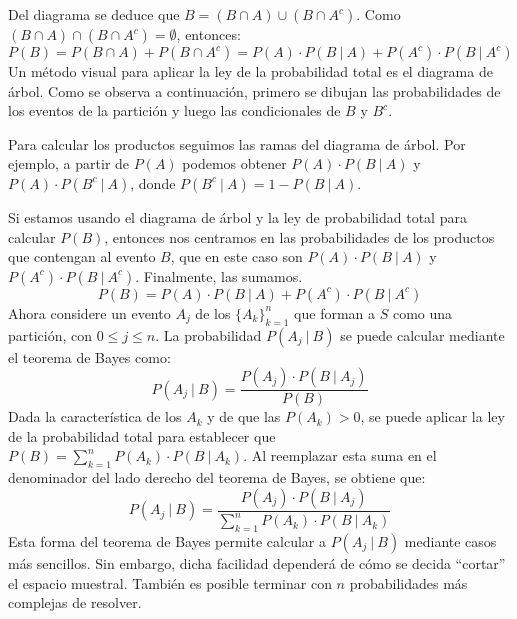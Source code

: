 \documentclass[12pt]{article}
\begin{document}
Del diagrama se deduce que $B = (B \cap A) \cup (B \cap A^{c})$. Como $(B \cap A) \cap (B \cap A^{c}) = \emptyset$, entonces:
\[
  P(B) = P(B \cap A) + P(B \cap A^{c}) = P(A) \cdot P(B \ | \ A) + P(A^{c}) \cdot P(B \ | \ A^{c})
\]
Un método visual para aplicar la ley de la probabilidad total es el diagrama de árbol. Como se observa a continuación, primero se dibujan las probabilidades de los eventos de la partición y luego las condicionales de $B$ y $B^{c}$.

\begin{figure}[hbt!]
\centering


\end{figure}

Para calcular los productos seguimos las ramas del diagrama de árbol. Por ejemplo, a partir de $P(A)$ podemos obtener $P(A) \cdot P(B \ | \ A)$ y $P(A) \cdot P(B^{c} \ | \ A)$, donde $P(B^{c} \ | \ A) = 1 - P(B \ | \ A)$.

Si estamos usando el diagrama de árbol y la ley de probabilidad total para calcular $P(B)$, entonces nos centramos en las probabilidades de los productos que contengan al evento $B$, que en este caso son $P(A) \cdot P(B \ | \ A)$ y $P(A^{c}) \cdot P(B \ | \ A^{c})$. Finalmente, las sumamos.
\[
  P(B) = P(A) \cdot P(B \ | \ A) + P(A^{c}) \cdot P(B \ | \ A^{c})
\]
Ahora considere un evento $A_{j}$ de los $\{A_{k}\}_{k = 1}^{n}$ que forman a $S$ como una partición, con $0 \leq j \leq n$. La probabilidad $P(A_{j} \ | \ B)$ se puede calcular mediante el teorema de Bayes como:
\[
  P(A_{j} \ | \ B) = \frac{P(A_{j}) \cdot P(B \ | \ A_{j})}{P(B)}
\]
Dada la característica de los $A_{k}$ y de que las $P(A_{k}) > 0$, se puede aplicar la ley de la probabilidad total para establecer que $P(B) = \sum_{k = 1}^{n} P(A_{k}) \cdot P(B \ | \ A_{k})$. Al reemplazar esta suma en el denominador del lado derecho del teorema de Bayes, se obtiene que:
\[
  P(A_{j} \ | \ B) = \frac{P(A_{j}) \cdot P(B \ | \ A_{j})}{\sum_{k = 1}^{n} P(A_{k}) \cdot P(B \ | \ A_{k})}
\]
Esta forma del teorema de Bayes permite calcular a $P(A_{j} \ | \ B)$ mediante casos más sencillos. Sin embargo, dicha facilidad dependerá de cómo se decida ``cortar'' el espacio muestral. También es posible terminar con $n$ probabilidades más complejas de resolver.
\end{document}
